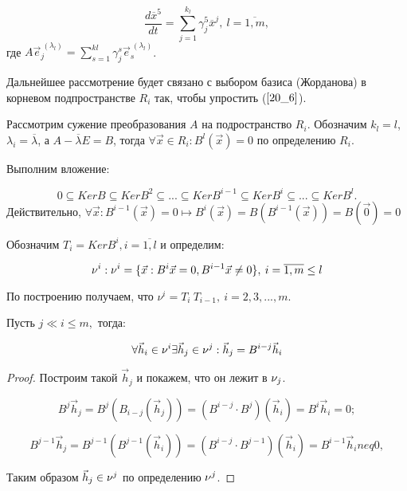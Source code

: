 \begin{equation}\label{20_6}
\frac{d\overline{x}^5}{dt} = \sum\limits_{j = 1}^{k_l}\gamma_j^5 \overline{x}^j, \: l = \overline{1, m},
\end{equation}
где $A \vec{e}^{\: (\lambda_l)}_j = \sum\limits_{s=1}^{kl}\gamma_j^s \vec{e}^{\: (\lambda_l)}_s$.

Дальнейшее рассмотрение будет связано с выбором базиса (Жорданова) в корневом подпространстве $R_i$ так, чтобы  упростить ($\ref{20_6}$).

Рассмотрим сужение преобразования $A$ на подространство $R_i$. Обозначим $k_l = l$, $\lambda_i = \overline{\lambda}$, а $A - \overline{\lambda} E = B$, тогда $\forall \vec{x}\in R_i: B^l (\vec{x}) = 0$ по определению $R_i$.

Выполним вложение:

\[0\subseteq Ker B \subseteq Ker B^2 \subseteq ... \subseteq Ker B^{i - 1} \subseteq Ker B^i \subseteq ... \subseteq Ker B^l.\]
Действительно, $\forall \vec{x}: B^{i-1}(\vec{x}) = 0 \mapsto B^i(\vec{x}) = B(B^{i-1}(\vec{x})) = B(\vec{0}) = 0$

Обозначим $T_i = Ker B^i, i = \overline{1,l}$ и определим:

\[\nu^i: \nu^i= \{\vec{x}: B^i \vec{x} = 0, B^{i-1}\vec{x} \neq 0 \}, \: i = \overline{1,m} \leq l\]

По построению получаем, что $\nu^i = T_i \ T_{i-1}, \: i = 2,3,...,m.$

\begin{theorem}\label{theor-20_1}
Пусть $j \ll i \leq m,$ тогда:

\begin{equation}\label{20_7}
\forall \vec{h}_i \in \nu^i \exists \vec{h}_j \in  \nu^j: \vec{h}_j = B^{i - j} \vec{h}_i
\end{equation}
\begin{proof}

Построим такой $\vec{h}_j$ и покажем, что он лежит в $\nu_j$.

\[B^j\vec{h}_j = B^j (B_{i-j} (\vec{h}_j)) = (B^{i - j} \cdot B^j)(\vec{h}_i) = B^i \vec{h}_i = 0; \]

\[B^{j- 1} \vec{h}_j = B^{j - 1}(B^{j - 1} (\vec{h}_i)) = (B^{i - j} \cdot B^{j-1})(\vec{h}_i) = B^{i-1} \vec{h}_i neq 0,\]

Таким образом $\vec{h}_j \in \nu^j$ по определению $\nu^j$.
\end{proof}
\end{theorem}

